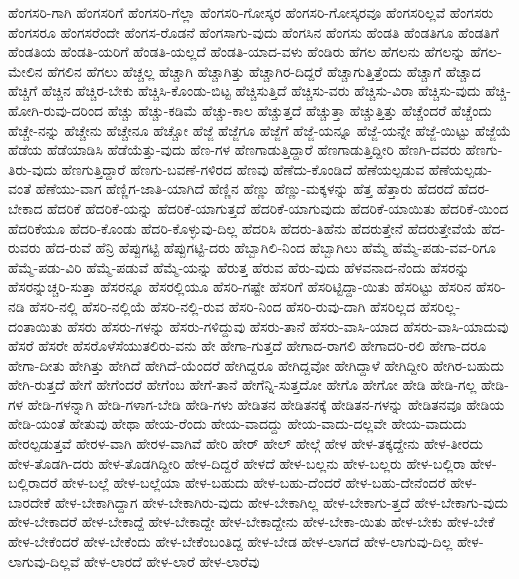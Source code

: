 {ಹೆಂಗಸರಿ-ಗಾಗಿ
ಹೆಂಗಸರಿಗೆ
ಹೆಂಗಸರಿ-ಗೆಲ್ಲಾ
ಹೆಂಗಸರಿ-ಗೋಸ್ಕರ
ಹೆಂಗಸರಿ-ಗೋಸ್ಕರವೂ
ಹೆಂಗಸರಿಲ್ಲವೆ
ಹೆಂಗಸರು
ಹೆಂಗಸರೂ
ಹೆಂಗಸರೆಂದೇ
ಹೆಂಗಸ-ರೊಡನೆ
ಹೆಂಗಸಾಗು-ವುದು
ಹೆಂಗಸಿನ
ಹೆಂಗಸು
ಹೆಂಡತಿ
ಹೆಂಡತಿಗೂ
ಹೆಂಡತಿಗೆ
ಹೆಂಡತಿಯ
ಹೆಂಡತಿ-ಯರಿಗೆ
ಹೆಂಡತಿ-ಯಲ್ಲದೆ
ಹೆಂಡತಿ-ಯಾದ-ವಳು
ಹೆಂಡಿರು
ಹೆಗಲ
ಹೆಗಲನು
ಹೆಗಲನ್ನು
ಹೆಗಲ-ಮೇಲಿನ
ಹೆಗಲಿನ
ಹೆಗಲು
ಹೆಚ್ಚಲ್ಲ
ಹೆಚ್ಚಾಗಿ
ಹೆಚ್ಚಾಗಿತ್ತು
ಹೆಚ್ಚಾಗಿರ-ದಿದ್ದರೆ
ಹೆಚ್ಚಾಗುತ್ತಿತ್ತೆಂದು
ಹೆಚ್ಚಾಗೆ
ಹೆಚ್ಚಾದ
ಹೆಚ್ಚಿಗೆ
ಹೆಚ್ಚಿನ
ಹೆಚ್ಚಿರ-ಬೇಕು
ಹೆಚ್ಚಿಸಿ-ಕೊಂಡು-ಬಿಟ್ಟ
ಹೆಚ್ಚಿಸುತ್ತಿದೆ
ಹೆಚ್ಚಿಸು-ವರು
ಹೆಚ್ಚಿಸು-ವಿರಾ
ಹೆಚ್ಚಿಸು-ವುದು
ಹೆಚ್ಚಿ-ಹೋಗಿ-ರುವು-ದರಿಂದ
ಹೆಚ್ಚು
ಹೆಚ್ಚು-ಕಡಿಮೆ
ಹೆಚ್ಚು-ಕಾಲ
ಹೆಚ್ಚುತ್ತದೆ
ಹೆಚ್ಚುತ್ತಾ
ಹೆಚ್ಚುತ್ತಿತ್ತು
ಹೆಚ್ಚೆಂದರೆ
ಹೆಚ್ಚೆಂದು
ಹೆಚ್ಚೇ-ನನ್ನು
ಹೆಚ್ಚೇನು
ಹೆಚ್ಚೇನೂ
ಹೆಚ್ಚೋ
ಹೆಜ್ಜೆ
ಹೆಜ್ಜೆಗೂ
ಹೆಜ್ಜೆಗೆ
ಹೆಜ್ಜೆ-ಯನ್ನೂ
ಹೆಜ್ಜೆ-ಯನ್ನೇ
ಹೆಜ್ಜೆ-ಯಿಟ್ಟು
ಹೆಜ್ಜೆಯೆ
ಹೆಡೆಯ
ಹೆಡೆಯಾಡಿಸಿ
ಹೆಡೆಯೆತ್ತು-ವುದು
ಹೆಣ-ಗಳ
ಹೆಣಗಾಡುತ್ತಿದ್ದಾರೆ
ಹೆಣಗಾಡುತ್ತಿದ್ದೀರಿ
ಹೆಣಗಿ-ದವರು
ಹೆಣಗು-ತಿರು-ವುದು
ಹೆಣಗುತ್ತಿದ್ದಾರೆ
ಹೆಣಗು-ಬವಣೆ-ಗಳಿರದ
ಹೆಣವು
ಹೆಣೆದು-ಕೊಂಡಿದೆ
ಹೆಣೆಯಲ್ಪಡುವ
ಹೆಣೆಯಲ್ಪಡು-ವಂತೆ
ಹೆಣೆಯು-ವಾಗ
ಹೆಣ್ಣಿಗ-ಜಾತಿ-ಯಾಗಿದೆ
ಹೆಣ್ಣಿನ
ಹೆಣ್ಣು
ಹೆಣ್ಣು-ಮಕ್ಕಳನ್ನು
ಹೆತ್ತ
ಹೆತ್ತಾರು
ಹೆದರದೆ
ಹೆದರ-ಬೇಕಾದ
ಹೆದರಿಕೆ
ಹೆದರಿಕೆ-ಯನ್ನು
ಹೆದರಿಕೆ-ಯಾಗುತ್ತದೆ
ಹೆದರಿಕೆ-ಯಾಗುವುದು
ಹೆದರಿಕೆ-ಯಾಯಿತು
ಹೆದರಿಕೆ-ಯಿಂದ
ಹೆದರಿಕೆಯೂ
ಹೆದರಿ-ಕೊಂಡು
ಹೆದರಿ-ಕೊಳ್ಳುವು-ದಿಲ್ಲ
ಹೆದರಿಸಿ
ಹೆದರು-ತಿಹೆನು
ಹೆದರುತ್ತೇನೆ
ಹೆದರುತ್ತೇವೆಯೆ
ಹೆದ-ರುವರು
ಹೆದ-ರುವೆ
ಹೆನ್ರಿ
ಹೆಪ್ಪುಗಟ್ಟಿ
ಹೆಪ್ಪುಗಟ್ಟಿ-ದರು
ಹೆಬ್ಬಾಗಿಲಿ-ನಿಂದ
ಹೆಬ್ಬಾಗಿಲು
ಹೆಮ್ಮೆ
ಹೆಮ್ಮೆ-ಪಡು-ವವ-ರಿಗೂ
ಹೆಮ್ಮೆ-ಪಡು-ವಿರಿ
ಹೆಮ್ಮೆ-ಪಡುವೆ
ಹೆಮ್ಮೆ-ಯನ್ನು
ಹೆರುತ್ತ
ಹೆರುವ
ಹೆರು-ವುದು
ಹೆಳವನಾದ-ನೆಂದು
ಹೆಸರನ್ನು
ಹೆಸರನ್ನುಚ್ಚರಿ-ಸುತ್ತಾ
ಹೆಸರನ್ನೂ
ಹೆಸರಲ್ಲಿಯೂ
ಹೆಸರಿ-ಗಷ್ಟೇ
ಹೆಸರಿಗೆ
ಹೆಸರಿಟ್ಟಿದ್ದಾ-ಯಿತು
ಹೆಸರಿಟ್ಟು
ಹೆಸರಿನ
ಹೆಸರಿ-ನಡಿ
ಹೆಸರಿ-ನಲ್ಲಿ
ಹೆಸರಿ-ನಲ್ಲಿಯೆ
ಹೆಸರಿ-ನಲ್ಲಿ-ರುವ
ಹೆಸರಿ-ನಿಂದ
ಹೆಸರಿ-ರುವು-ದಾಗಿ
ಹೆಸರಿಲ್ಲದ
ಹೆಸರಿಲ್ಲ-ದಂತಾಯಿತು
ಹೆಸರು
ಹೆಸರು-ಗಳನ್ನು
ಹೆಸರು-ಗಳಿದ್ದುವು
ಹೆಸರು-ತಾನೆ
ಹೆಸರು-ವಾಸಿ-ಯಾದ
ಹೆಸರು-ವಾಸಿ-ಯಾದುವು
ಹೆಸರೆ
ಹೆಸರೇ
ಹೆಸರೊಳೆಸೆಯುತಲಿರು-ವನು
ಹೇ
ಹೇಗಾ-ಗುತ್ತದೆ
ಹೇಗಾದ-ರಾಗಲಿ
ಹೇಗಾದರಿ-ರಲಿ
ಹೇಗಾ-ದರೂ
ಹೇಗಾ-ದೀತು
ಹೇಗಿತ್ತು
ಹೇಗಿದೆ
ಹೇಗಿದೆ-ಯೆಂದರೆ
ಹೇಗಿದ್ದರೂ
ಹೇಗಿದ್ದವೋ
ಹೇಗಿದ್ದಾಳೆ
ಹೇಗಿದ್ದೀರಿ
ಹೇಗಿರ-ಬಹುದು
ಹೇಗಿ-ರುತ್ತದೆ
ಹೇಗೆ
ಹೇಗೆಂದರೆ
ಹೇಗೆಂಬ
ಹೇಗೆ-ತಾನೆ
ಹೇಗೆನ್ನಿ-ಸುತ್ತದೋ
ಹೇಗೊ
ಹೇಗೋ
ಹೇಡಿ
ಹೇಡಿ-ಗಲ್ಲ
ಹೇಡಿ-ಗಳ
ಹೇಡಿ-ಗಳನ್ನಾಗಿ
ಹೇಡಿ-ಗಳಾಗ-ಬೇಡಿ
ಹೇಡಿ-ಗಳು
ಹೇಡಿತನ
ಹೇಡಿತನಕ್ಕೆ
ಹೇಡಿತನ-ಗಳನ್ನು
ಹೇಡಿತನವೂ
ಹೇಡಿಯ
ಹೇಡಿ-ಯಂತೆ
ಹೇತುವು
ಹೇಥಾ
ಹೇಯ-ರೆಂದು
ಹೇಯ-ವಾದದ್ದು
ಹೇಯ-ವಾದು-ದಲ್ಲವೇ
ಹೇಯ-ವಾದುದು
ಹೇರಲ್ಪಡುತ್ತವೆ
ಹೇರಳ-ವಾಗಿ
ಹೇರಳ-ವಾಗಿವೆ
ಹೇರಿ
ಹೇರ್
ಹೇಲ್
ಹೇಲ್ಗೆ
ಹೇಳ
ಹೇಳ-ತಕ್ಕದ್ದೇನು
ಹೇಳ-ತೀರದು
ಹೇಳ-ತೊಡಗಿ-ದರು
ಹೇಳ-ತೊಡಗಿದ್ದೀರಿ
ಹೇಳ-ದಿದ್ದರೆ
ಹೇಳದೆ
ಹೇಳ-ಬಲ್ಲನು
ಹೇಳ-ಬಲ್ಲರು
ಹೇಳ-ಬಲ್ಲಿರಾ
ಹೇಳ-ಬಲ್ಲಿರಾದರೆ
ಹೇಳ-ಬಲ್ಲೆ
ಹೇಳ-ಬಲ್ಲೆಯಾ
ಹೇಳ-ಬಹುದು
ಹೇಳ-ಬಹು-ದೆಂದರೆ
ಹೇಳ-ಬಹು-ದೇನೆಂದರೆ
ಹೇಳ-ಬಾರದೇಕೆ
ಹೇಳ-ಬೇಕಾಗಿದ್ದಾಗ
ಹೇಳ-ಬೇಕಾಗಿರು-ವುದು
ಹೇಳ-ಬೇಕಾಗಿಲ್ಲ
ಹೇಳ-ಬೇಕಾಗು-ತ್ತದೆ
ಹೇಳ-ಬೇಕಾಗು-ವುದು
ಹೇಳ-ಬೇಕಾದರೆ
ಹೇಳ-ಬೇಕಾದ್ದೆ
ಹೇಳ-ಬೇಕಾದ್ದೇ
ಹೇಳ-ಬೇಕಾದ್ದೇನು
ಹೇಳ-ಬೇಕಾ-ಯಿತು
ಹೇಳ-ಬೇಕು
ಹೇಳ-ಬೇಕೆ
ಹೇಳ-ಬೇಕೆಂದರೆ
ಹೇಳ-ಬೇಕೆಂದು
ಹೇಳ-ಬೇಕೆಂಬಂತಿದ್ದ
ಹೇಳ-ಬೇಡ
ಹೇಳ-ಲಾಗದೆ
ಹೇಳ-ಲಾಗುವು-ದಿಲ್ಲ
ಹೇಳ-ಲಾಗುವು-ದಿಲ್ಲವೆ
ಹೇಳ-ಲಾರದೆ
ಹೇಳ-ಲಾರೆ
ಹೇಳ-ಲಾರೆವು
}
